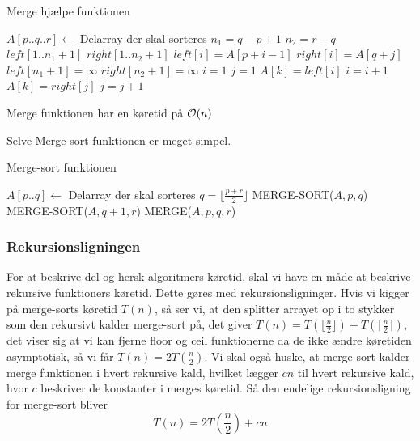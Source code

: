 \begin{algorithm}[H]
  \caption{Merge hjælpe funktionen}
  \begin{algorithmic}[1]
    \State $A[p..q..r] \gets$ Delarray der skal sorteres  
    \State $n_1 = q - p + 1$
    \State $n_2 = r - q$
    \State $left[1 .. n_1 + 1]$
    \State $right[1 .. n_2 + 1]$
    \State $left[i] = A[p + i - 1]$ 
    \EndFor
    \State $right[i] = A[q + j]$ 
    \EndFor
    \State $left[n_1 + 1] = \infty$
    \State $right[n_2 + 1] = \infty$ 
    \State $i = 1$
    \State $j = 1$
    \State $A[k] = left[i]$
    \State $i = i + 1$
    \Else
    \State $A[k] = right[j]$
    \State $j = j + 1$
    \EndIf
    \EndFor
    \EndFunction
  \end{algorithmic}
\end{algorithm}

Merge funktionen har en køretid på $\mathcal{O}(n)$

Selve Merge-sort funktionen er meget simpel.
\begin{algorithm}[H]
  \caption{Merge-sort funktionen}
  \begin{algorithmic}[1]
    \State $A[p..q] \gets$ Delarray der skal sorteres  
    \State $q = \lfloor \frac{p + r}{2} \rfloor$
    \State MERGE-SORT($A, p, q$)
    \State MERGE-SORT($A, q + 1, r$)
    \State MERGE($A, p, q, r$)
    \EndIf
    \EndFunction
  \end{algorithmic}
\end{algorithm}

\subsubsection{Rekursionsligningen}
For at beskrive del og hersk algoritmers køretid, skal vi have en måde at beskrive rekursive funktioners køretid. Dette gøres med rekursionsligninger. Hvis vi kigger på merge-sorts køretid $T(n)$, så ser vi, at den splitter arrayet op i to stykker som den rekursivt kalder merge-sort på, det giver $T(n) = T(\lfloor \frac{n}{2} \rfloor) + T(\lceil \frac{n}{2} \rceil)$, det viser sig at vi kan fjerne floor og ceil funktionerne da de ikke ændre køretiden asymptotisk, så vi får $T(n) = 2T(\frac{n}{2})$. Vi skal også huske, at merge-sort kalder merge funktionen i hvert rekursive kald, hvilket lægger $cn$ til hvert rekursive kald, hvor $c$ beskriver de konstanter i merges køretid. Så den endelige rekursionsligning for merge-sort bliver
$$T(n) = 2T(\frac{n}{2}) + cn$$
